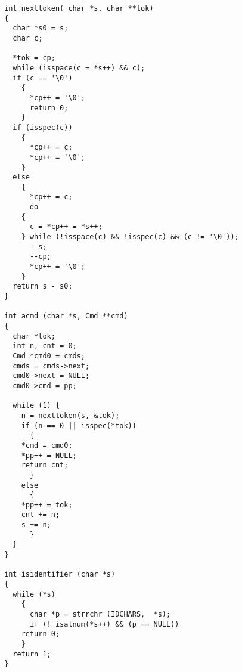 \begin{lstlisting}
int nexttoken( char *s, char **tok)
{
  char *s0 = s;
  char c;

  *tok = cp;
  while (isspace(c = *s++) && c);
  if (c == '\0')
    {
      *cp++ = '\0';
      return 0;
    }
  if (isspec(c))
    {
      *cp++ = c;
      *cp++ = '\0';
    }
  else
    {
      *cp++ = c;
      do
	{
	  c = *cp++ = *s++;
	} while (!isspace(c) && !isspec(c) && (c != '\0'));
      --s;
      --cp;
      *cp++ = '\0';
    }
  return s - s0;
}

int acmd (char *s, Cmd **cmd)
{
  char *tok;
  int n, cnt = 0;
  Cmd *cmd0 = cmds;
  cmds = cmds->next;
  cmd0->next = NULL;
  cmd0->cmd = pp;

  while (1) {
    n = nexttoken(s, &tok);
    if (n == 0 || isspec(*tok))
      {
	*cmd = cmd0;
	*pp++ = NULL;
	return cnt;
      }
    else
      {
	*pp++ = tok;
	cnt += n;
	s += n;
      }
  }
}

int isidentifier (char *s)
{
  while (*s)
    {
      char *p = strrchr (IDCHARS,  *s);
      if (! isalnum(*s++) && (p == NULL))
	return 0;
    }
  return 1;
}

\end{lstlisting}
